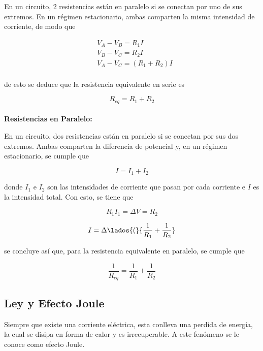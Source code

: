 En un circuito, 2 resistencias están en paralelo si se conectan por uno de sus extremos. En un régimen estacionario, ambas comparten la misma intensidad de corriente, de modo que

\begin{equation}
\begin{split}    
    &V_A-V_B=R_1I\\
    &V_B-V_C=R_2I\\
    &V_A-V_C=(R_1+R_2)I\\
\end{split}
\nonumber
\end{equation}

de esto se deduce que la resistencia equivalente en serie es

\[R_{eq}=R_1+R_2\]
\hfill \\
\textbf{Resistencias en Paralelo:}

En un circuito, dos resistencias están en paralelo si se conectan por sus dos extremos. Ambas comparten la diferencia de potencial y, en un régimen estacionario, se cumple que

\[I=I_1+I_2\]

donde $I_1$ e $I_2$ son las intensidades de corriente que pasan por cada corriente e $I$ es la intensidad total. Con esto, se tiene que

\[R_1I_1=\Delta V=R_2\]

\[I = \Delta\lados{(}{\frac{1}{R_1}+\frac{1}{R_2}}\]

se concluye así que, para la resistencia equivalente en paralelo, se cumple que

\[\frac{1}{R_{eq}}=\frac{1}{R_1}+\frac{1}{R_2}\]


\subsection{Ley y Efecto Joule}
Siempre que existe una corriente eléctrica, esta conlleva una perdida de energía, la cual se disipa en forma de calor y es irrecuperable. A este fenómeno se le conoce como efecto Joule.
